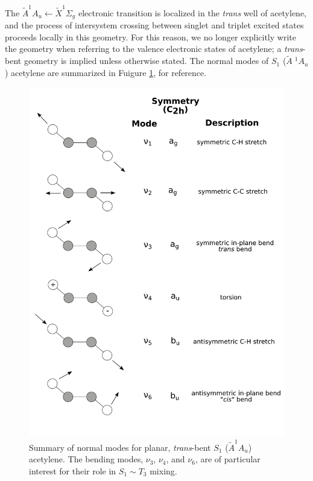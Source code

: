 \documentclass[12pt]{mitthesis}
\begin{document}
The $\tilde{A}^1A_u \leftarrow \tilde{X}^1\Sigma_g$ electronic
transition is localized in the \emph{trans} well of acetylene, and the
process of intersystem crossing between singlet and triplet excited
states proceeds locally in this geometry.  For this reason, we no
longer explicitly write the geometry when referring to the valence
electronic states of acetylene; a \emph{trans}-bent geometry is
implied unless otherwise stated.  The normal modes of $S_1$
($\tilde{A}\;^1A_u$) acetylene are summarized in Fuigure
\ref{fig:modes}, for reference.

\begin{figure}
  \centering
  \includegraphics[width=5.8in]{s1-modes.pdf}
  \caption{Summary of normal modes for planar, \emph{trans}-bent $S_1$
    ($\tilde{A}^1A_u$) acetylene.  The bending modes, $\nu_3$,
    $\nu_4$, and $\nu_6$, are of particular interest for their role in
    $S_1 \sim T_3$ mixing.}
  \label{fig:modes}
\end{figure} 
\end{document}
